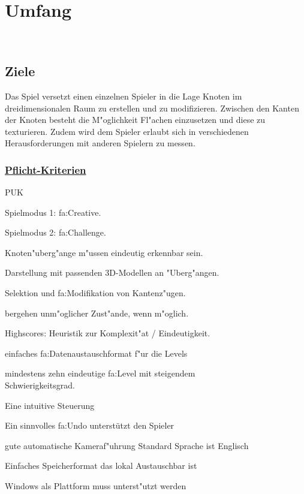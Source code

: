 %
%


\chapter{Umfang}
\label{UF}~\\


%
%
\section{Ziele}
\label{UF:Ziele}

Das Spiel versetzt einen einzelnen Spieler in die Lage Knoten im dreidimensionalen Raum zu erstellen und zu modifizieren. Zwischen den Kanten der Knoten besteht die M{"o}glichkeit Fl{"a}chen einzusetzen und diese zu texturieren. Zudem wird dem Spieler erlaubt sich in verschiedenen Herausforderungen mit anderen Spielern zu messen.\\

% 
%
\subsection*{\underline{Pflicht-Kriterien}}

\begin{ids}{\gls{PUK}}


		\id[10] Spielmodus 1: \gls{fa:Creative}.
		
		\id[20] Spielmodus 2: \gls{fa:Challenge}.
		
		\id[30] Knoten{"u}berg{"a}nge m{"u}ssen eindeutig erkennbar sein.
		
		\id[40] Darstellung mit passenden 3D-Modellen an {"U}berg{"a}ngen.
		
		\id[50] Selektion und \gls{fa:Modifikation} von Kantenz{"u}gen.
		
		bergehen unm{"o}glicher Zust{"a}nde, wenn m{"o}glich.
		
		\id[70] Highscores: Heuristik zur Komplexit{"a}t / Eindeutigkeit.
		
		\id[80] einfaches \gls{fa:Datenaustauschformat} f{"u}r die Levels
		
		\id[80] mindestens zehn eindeutige \gls{fa:Level} mit steigendem \\Schwierigkeitsgrad.
		
		\id[90] Eine intuitive Steuerung 
		
		\id[100] Ein sinnvolles \gls{fa:Undo} unterstützt den Spieler
		
		\id[110] gute automatische Kameraf{"u}hrung
		\id[120] Standard Sprache ist Englisch
		
	
		\id[130] Einfaches Speicherformat das lokal Austauschbar ist
		
		\id[140] Windows als Plattform muss unterst{"u}tzt werden

\end{ids}

